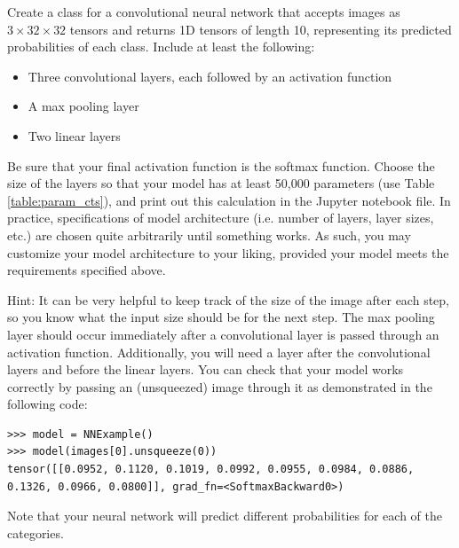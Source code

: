 \begin{problem}
Create a class for a convolutional neural network that accepts images as \(3\times32\times32\) tensors and returns 1D tensors of length 10, representing its predicted probabilities of each class.
Include at least the following:
\begin{itemize}
	\item Three convolutional layers, each followed by an activation function
	\item A max pooling layer
	\item Two linear layers
\end{itemize}
Be sure that your final activation function is the softmax function.
Choose the size of the layers so that your model has at least 50,000 parameters (use Table \ref{table:param_cts}), and print out this calculation in the Jupyter notebook file.
In practice, specifications of model architecture (i.e. number of layers, layer sizes, etc.) are chosen quite arbitrarily until something works.
As such, you may customize your model architecture to your liking, provided your model meets the requirements specified above.

Hint: It can be very helpful to keep track of the size of the image after each step, so you know what the input size should be for the next step.
The max pooling layer should occur immediately after a convolutional layer is passed through an activation function.
Additionally, you will need a  layer after the convolutional layers and before the linear layers.
You can check that your model works correctly by passing an (unsqueezed) image through it as demonstrated in the following code:

\begin{lstlisting}
>>> model = NNExample()
>>> model(images[0].unsqueeze(0))
tensor([[0.0952, 0.1120, 0.1019, 0.0992, 0.0955, 0.0984, 0.0886, 0.1326, 0.0966, 0.0800]], grad_fn=<SoftmaxBackward0>)
\end{lstlisting}
Note that your neural network will predict different probabilities for each of the categories.

\end{problem}

